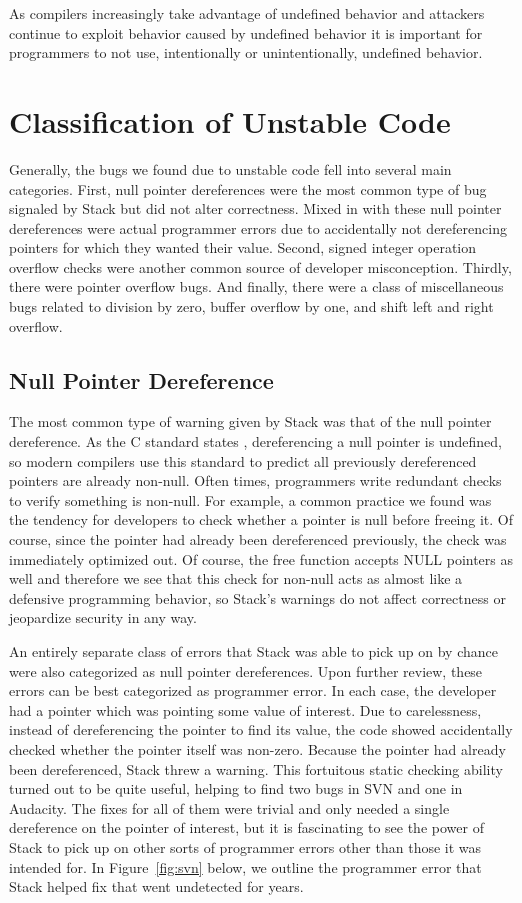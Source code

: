 \documentclass[10pt,twocolumn]{article}
\begin{document}
As compilers increasingly take advantage of undefined behavior \cite{stack} and
attackers continue to exploit behavior caused by undefined behavior it is
important for programmers to not use, intentionally or unintentionally,
undefined behavior.

\section{Classification of Unstable Code}
\label{sec:classification}
Generally, the bugs we found due to unstable code fell into several main
categories. First, null pointer dereferences were the  most common type of bug
signaled by Stack but did not alter correctness. Mixed in with these null
pointer dereferences were actual programmer errors due to accidentally not
dereferencing pointers for which they wanted their value. Second, signed
integer operation overflow checks were another common source of developer
misconception. Thirdly, there were pointer overflow bugs. And finally, there
were a class of miscellaneous bugs related to division by zero, buffer overflow
by one, and shift left and right overflow.


\subsection{Null Pointer Dereference}
The most common type of warning given by Stack was that of the null pointer
dereference. As the C standard states \cite{c11}, dereferencing a null pointer is
undefined, so modern compilers use this standard to predict all previously
dereferenced pointers are already non-null. Often times, programmers write
redundant checks to verify something is non-null. For example, a common
practice we found was the tendency for developers to check whether a pointer is
null before freeing it. Of course, since the pointer had already been
dereferenced previously, the check was immediately optimized out. Of course,
the free function accepts NULL pointers as well and therefore we see that this
check for non-null acts as almost like a defensive programming behavior, so
Stack's warnings do not affect correctness or jeopardize security in any way. 

An entirely separate class of errors that Stack was able to pick up on by
chance were also categorized as null pointer dereferences. Upon further review,
these errors can be best categorized as programmer error. In each case, the
developer had a pointer which was pointing some value of interest. Due to
carelessness, instead of dereferencing the pointer to find its value, the code
showed accidentally checked whether the pointer itself was non-zero. Because
the pointer had already been dereferenced, Stack threw a warning. This
fortuitous static checking ability turned out to be quite useful, helping to
find two bugs in SVN and one in Audacity. The fixes for all of them were
trivial and only needed a single dereference on the pointer of interest, but it
is fascinating to see the power of Stack to pick up on other sorts of
programmer errors other than those it was intended for. In Figure~\ref{fig:svn}
below, we outline the programmer error that Stack helped fix that went
undetected for years.
\end{document}
